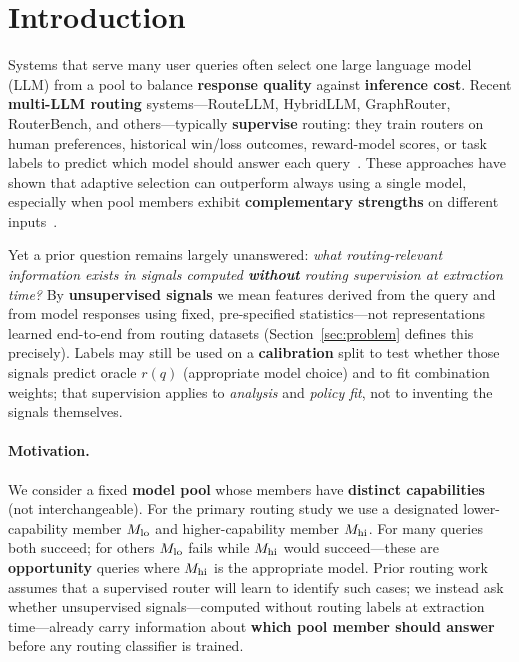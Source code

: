 \section{Introduction}
\label{sec:intro}

Systems that serve many user queries often select one large language model (LLM) from a pool to balance \textbf{response quality} against \textbf{inference cost}.
Recent \textbf{multi-LLM routing} systems---RouteLLM, HybridLLM, GraphRouter, RouterBench, and others---typically \textbf{supervise} routing: they train routers on human preferences, historical win/loss outcomes, reward-model scores, or task labels to predict which model should answer each query~\citep{ong2024routellm,ding2024hybrid,feng2025graphrouter,hu2024routerbench}.
These approaches have shown that adaptive selection can outperform always using a single model, especially when pool members exhibit \textbf{complementary strengths} on different inputs~\citep{hu2024routerbench,chen2024frugalgpt}.

Yet a prior question remains largely unanswered:
\emph{what routing-relevant information exists in signals computed \textbf{without} routing supervision at extraction time?}
By \textbf{unsupervised signals} we mean features derived from the query and from model responses using fixed, pre-specified statistics---not representations learned end-to-end from routing datasets (Section~\ref{sec:problem} defines this precisely).
Labels may still be used on a \textbf{calibration} split to test whether those signals predict oracle $r(q)$ (appropriate model choice) and to fit combination weights; that supervision applies to \emph{analysis} and \emph{policy fit}, not to inventing the signals themselves.

\paragraph{Motivation.}
We consider a fixed \textbf{model pool} whose members have \textbf{distinct capabilities} (not interchangeable).
For the primary routing study we use a designated lower-capability member $M_{\mathrm{lo}}$ and higher-capability member $M_{\mathrm{hi}}$.
For many queries both succeed; for others $M_{\mathrm{lo}}$ fails while $M_{\mathrm{hi}}$ would succeed---these are \textbf{opportunity} queries where $M_{\mathrm{hi}}$ is the appropriate model.
Prior routing work assumes that a supervised router will learn to identify such cases; we instead ask whether unsupervised signals---computed without routing labels at extraction time---already carry information about \textbf{which pool member should answer} before any routing classifier is trained.

